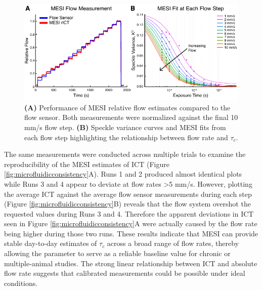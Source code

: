 \begin{figure}
    \includegraphics{figures/chapter_4/microfluidicrelativeflow.pdf}
    \caption{
        \label{fig:microfluidicrelativeflow}
        \textbf{(A)} Performance of MESI relative flow estimates compared to the flow sensor. Both measurements were normalized against the final 10 mm/s flow step. \textbf{(B)} Speckle variance curves and MESI fits from each flow step highlighting the relationship between flow rate and $\tau_c$.
    }
\end{figure}

The same measurements were conducted across multiple trials to examine the reproducibility of the MESI estimates of ICT (Figure \ref{fig:microfluidicconsistency}A). Runs 1 and 2 produced almost identical plots while Runs 3 and 4 appear to deviate at flow rates \textgreater 5 mm/s. However, plotting the average ICT against the average flow sensor measurements during each step (Figure \ref{fig:microfluidicconsistency}B) reveals that the flow system overshot the requested values during Runs 3 and 4. Therefore the apparent deviations in ICT seen in Figure \ref{fig:microfluidicconsistency}A were actually caused by the flow rate being higher during those two runs. These results indicate that MESI can provide stable day-to-day estimates of $\tau_c$ across a broad range of flow rates, thereby allowing the parameter to serve as a reliable baseline value for chronic or multiple-animal studies. The strong linear relationship between ICT and absolute flow rate suggests that calibrated measurements could be possible under ideal conditions.

